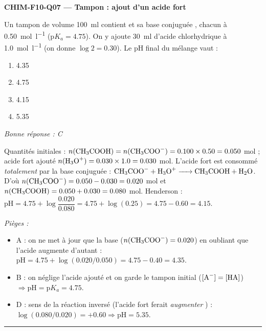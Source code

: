 \documentclass[11pt,a4paper]{article}
\begin{document}
\noindent\textbf{CHIM-F10-Q07 --- Tampon : ajout d'un acide fort}\par
Un tampon de volume \qty{100}{\milli\litre} contient  et sa base conjuguée , chacun à \qty{0.50}{\mol\per\litre} ($\mathrm{p}K_a = \num{4.75}$). On y ajoute \qty{30}{\milli\litre} d'acide chlorhydrique  à \qty{1.0}{\mol\per\litre} (on donne $\log 2 = \num{0.30}$). Le pH final du mélange vaut :
\begin{enumerate}[label=\Alph*)]
\item \num{4.35}
\item \num{4.75}
\item \num{4.15}
\item \num{5.35}
\end{enumerate}
\textit{Bonne réponse : C}\par
Quantités initiales : $n(\ce{CH3COOH}) = n(\ce{CH3COO-}) = \num{0.100}\times\num{0.50} = \num{0.050}$ \si{\mol} ; acide fort ajouté $n(\ce{H3O+}) = \num{0.030}\times\num{1.0} = \num{0.030}$ \si{\mol}. L'acide fort est consommé \emph{totalement} par la base conjuguée : $\ce{CH3COO- + H3O+ -> CH3COOH + H2O}$. D'où $n(\ce{CH3COO-}) = \num{0.050}-\num{0.030} = \num{0.020}$ \si{\mol} et $n(\ce{CH3COOH}) = \num{0.050}+\num{0.030} = \num{0.080}$ \si{\mol}. Henderson : $\mathrm{pH} = \num{4.75} + \log\dfrac{\num{0.020}}{\num{0.080}} = \num{4.75} + \log(\num{0.25}) = \num{4.75} - \num{0.60} = \num{4.15}$.\par
\textit{Pièges :}
\begin{itemize}
\item A : on ne met à jour que la base ($n(\ce{CH3COO-})=\num{0.020}$) en oubliant que l'acide augmente d'autant : $\mathrm{pH} = \num{4.75}+\log(\num{0.020}/\num{0.050}) = \num{4.75}-\num{0.40} = \num{4.35}$.
\item B : on néglige l'acide ajouté et on garde le tampon initial ($[\ce{A-}]=[\ce{HA}]$) $\Rightarrow \mathrm{pH} = \mathrm{p}K_a = \num{4.75}$.
\item D : sens de la réaction inversé (l'acide fort ferait \emph{augmenter} ) : $\log(\num{0.080}/\num{0.020}) = +\num{0.60} \Rightarrow \mathrm{pH} = \num{5.35}$.
\end{itemize}
\vspace{6pt}\hrule\vspace{8pt}
\end{document}
